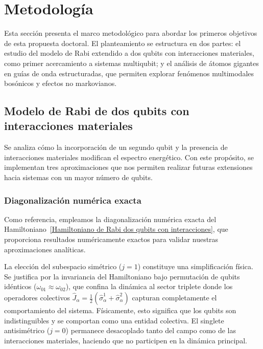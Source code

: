 \documentclass[onecolumn,notitlepage,letterpaper,aps,pra,12pt]{article}
\numberwithin{equation}{section}
\begin{document}
\section{Metodología}

Esta sección presenta el marco metodológico para abordar los primeros objetivos de esta propuesta doctoral. El planteamiento se estructura en dos partes:  el estudio del modelo de Rabi extendido a dos qubits con interacciones materiales, como primer acercamiento a sistemas multiqubit; y el análisis de átomos gigantes en guías de onda estructuradas, que permiten explorar fenómenos multimodales bosónicos y efectos no markovianos. 

\subsection{Modelo de Rabi de dos qubits con interacciones materiales}

Se analiza cómo la incorporación de un segundo qubit y la presencia de interacciones materiales modifican el espectro energético. Con este propósito, se implementan tres aproximaciones  que nos permiten realizar futuras extensiones hacia sistemas con un mayor número de qubits.


\subsubsection{Diagonalización numérica exacta}

Como referencia, empleamos la diagonalización numérica exacta del Hamiltoniano~\eqref{Hamiltoniano de Rabi dos qubits con interacciones}, que proporciona resultados numéricamente exactos para validar nuestras aproximaciones analíticas. 

La elección del subespacio simétrico ($j=1$) constituye una simplificación física. Se justifica por la invariancia del Hamiltoniano bajo permutación de qubits idénticos ($\omega_{01} \approx \omega_{02}$), que confina la dinámica al sector triplete donde los operadores colectivos $\hat{J}_{\alpha} = \frac{1}{2}(\hat{\sigma}_{\alpha}^{1} + \hat{\sigma}_{\alpha}^{2})$ capturan completamente el comportamiento del sistema. Físicamente, esto significa que los qubits son indistinguibles y se comportan como una entidad colectiva. El singlete antisimétrico ($j=0$) permanece desacoplado tanto del campo como de las interacciones materiales, haciendo que no participen en la dinámica principal.
\end{document}
